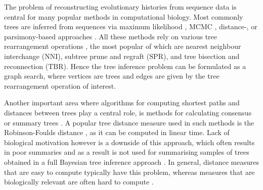 \documentclass[11pt]{amsart}
\newcommand{\nni}{\mathrm{NNI}}
\newcommand{\spr}{\mathrm{SPR}}
\newcommand{\tbr}{\mathrm{TBR}}
\begin{document}
The problem of reconstructing evolutionary histories from sequence data is central for many popular methods in computational biology.
Most commonly trees are inferred from sequences via maximum likelihood \autocite{Stamatakis2006-xb, Guindon2010-lo}, MCMC \autocite{Ronquist2003-eq, Suchard2018-tw, Bouckaert2019-yr}, distance-, or parsimony-based approaches \autocite{Tamura2011-ky}.
All these methods rely on various tree rearrangement operations \autocite{Semple2003-nj}, the most popular of which are nearest neighbour interchange ($\nni$), subtree prune and regraft ($\spr$), and tree bisection and reconnection ($\tbr$).
Hence the tree inference problem can be formulated as a graph search, where vertices are trees and edges are given by the tree rearrangement operation of interest.

Another important area where algorithms for computing shortest paths and distances between trees play a central role, is methods for calculating consensus or summary trees \autocite{McMorris1994-no, Bansal2010-vr, Whidden2014-sx}.
A popular tree distance measure used in such methods is the Robinson-Foulds distance \autocite{Robinson1981-fb}, as it can be computed in linear time.
Lack of biological motivation however is a downside of this approach, which often results in poor summaries and as a result is not used for summarising samples of trees obtained in a full Bayesian tree inference approach \autocite{Gavryushkin2016-uu}.
In general, distance measures that are easy to compute typically have this problem, whereas measures that are biologically relevant are often hard to compute \autocite{Whidden2018-fw}.
\end{document}
